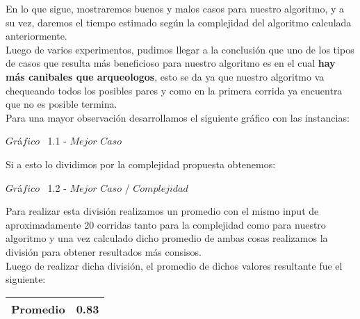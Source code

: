 \indent En lo que sigue, mostraremos buenos y malos casos para nuestro algoritmo, y a su vez, daremos el tiempo estimado 
seg\'un la complejidad del algoritmo calculada anteriormente.\\

Luego de varios experimentos, pudimos llegar a la conclusi\'on que uno de los tipos de casos que resulta m\'as beneficioso para nuestro algoritmo
es en el cual \textbf{hay m\'as canibales que arqueologos}, esto se da ya que nuestro algoritmo va chequeando todos los posibles pares y como en la primera corrida ya encuentra que no es posible termina.\\

Para una mayor observaci\'on desarrollamos el siguiente gr\'afico con las instancias:\\

\vspace*{0.3cm} \vspace*{0.3cm}
  \begin{center}
 {$Gr$\'a$fico$ \ 1.1 - $Mejor$ $Caso$}
  \end{center}
  \vspace*{0.3cm}


Si a esto lo dividimos por la complejidad propuesta obtenemos:\\

\vspace*{0.3cm} \vspace*{0.3cm}
  \begin{center}
 {$Gr$\'a$fico$ \ 1.2 - $Mejor$ $Caso$ / $Complejidad$}
  \end{center}
  \vspace*{0.3cm}

 Para realizar esta divisi\'on realizamos un promedio con el mismo input de aproximadamente 20 corridas tanto para la complejidad como para nuestro algoritmo y una vez calculado dicho promedio de ambas cosas realizamos la divisi\'on para
obtener resultados m\'as consisos.\\ 

Luego de realizar dicha divisi\'on, el promedio de dichos valores resultante fue el siguiente:

\begin{center}
\begin{table}[H]

    \begin{tabular}{ | l |l |}
    \hline

\textbf{Promedio} & 0.83 \\ \hline

    \end{tabular}
\end{table}
\end{center}


